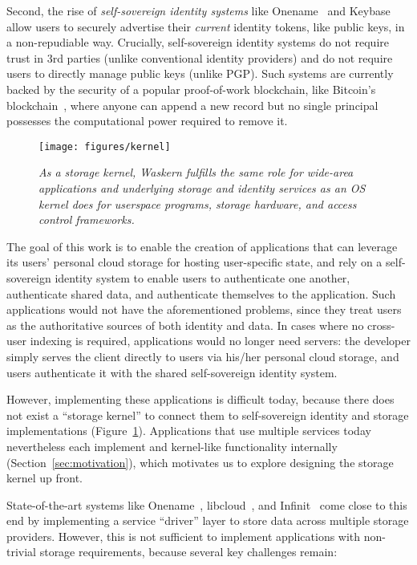 Second, the rise of \textit{self-sovereign identity systems} like
Onename~\cite{onename} and Keybase~\cite{keybase} allow users to
securely advertise their \textit{current} identity tokens, like public keys, in a
non-repudiable way.  Crucially, self-sovereign identity systems do not
require trust in 3rd parties (unlike conventional identity providers)
and do not require users to directly manage public keys (unlike PGP).
Such systems are currently backed by the security of a popular proof-of-work blockchain, like
Bitcoin's blockchain~\cite{bitcoin}, where anyone can append a new record
but no single principal possesses the computational power required to remove it.

\begin{figure}[h!]
\centering
\texttt{[image: figures/kernel]}
\caption{\it As a storage kernel, Waskern fulfills the same role for wide-area
applications and underlying storage and identity services as an OS kernel does
   for userspace programs, storage hardware, and access control frameworks.}
\label{fig:kernel}
\end{figure}

The goal of this work is to enable the creation of applications that can
leverage its users' personal cloud storage for hosting user-specific state, and
rely on a self-sovereign identity system to enable users to authenticate one
another, authenticate shared data, and authenticate themselves to the application.
Such applications would not have the aforementioned problems, since they
treat users as the authoritative sources of both identity and data.  In cases
where no cross-user indexing is required, applications would no longer need
servers:  the developer simply serves the client directly to users via his/her
personal cloud storage, and users authenticate it with the shared self-sovereign
identity system.

However, implementing these applications is difficult today,
because there does not exist a ``storage kernel'' to connect them to
self-sovereign identity and storage implementations (Figure~\ref{fig:kernel}).
Applications that use multiple services today nevertheless each implement and
kernel-like functionality internally (Section~\ref{sec:motivation}), which motivates us to
explore designing the storage kernel up front.

State-of-the-art systems like Onename~\cite{onename},
libcloud~\cite{libcloud}, and Infinit~\cite{infinite} come close to this
end by implementing a service ``driver'' layer to
store data across multiple storage providers.  However, this is not
sufficient to implement applications with non-trivial storage requirements,
because several key challenges remain:

